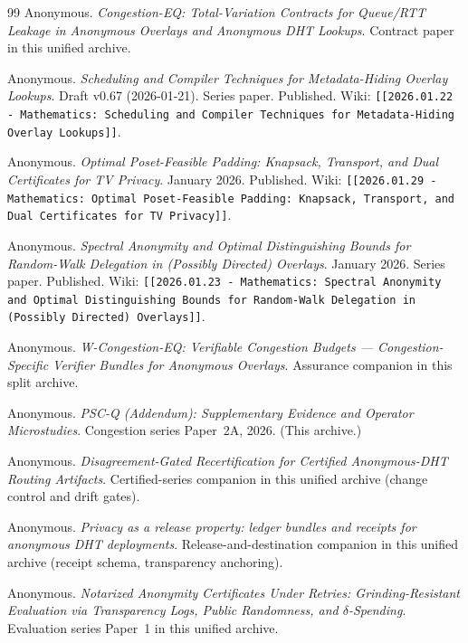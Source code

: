 \documentclass[11pt]{article}
\theoremstyle{definition}
\theoremstyle{remark}
\begin{document}
\begin{thebibliography}{99}
Anonymous.
\newblock \emph{Congestion-EQ: Total-Variation Contracts for Queue/RTT Leakage in Anonymous Overlays and Anonymous DHT Lookups}.
\newblock Contract paper in this unified archive.

Anonymous.
\newblock \emph{Scheduling and Compiler Techniques for Metadata-Hiding Overlay Lookups}.
\newblock Draft v0.67 (2026-01-21). Series paper.
\newblock Published. Wiki: \texttt{[[2026.01.22 - Mathematics: Scheduling and Compiler Techniques for Metadata-Hiding Overlay Lookups]]}.

Anonymous.
\newblock \emph{Optimal Poset-Feasible Padding: Knapsack, Transport, and Dual Certificates for TV Privacy}.
\newblock January 2026. Published. Wiki: \texttt{[[2026.01.29 - Mathematics: Optimal Poset-Feasible Padding: Knapsack, Transport, and Dual Certificates for TV Privacy]]}.

Anonymous.
\newblock \emph{Spectral Anonymity and Optimal Distinguishing Bounds for Random-Walk Delegation in (Possibly Directed) Overlays}.
\newblock January 2026. Series paper.
\newblock Published. Wiki: \texttt{[[2026.01.23 - Mathematics: Spectral Anonymity and Optimal Distinguishing Bounds for Random-Walk Delegation in (Possibly Directed) Overlays]]}.

Anonymous.
\newblock \emph{W-Congestion-EQ: Verifiable Congestion Budgets --- Congestion-Specific Verifier Bundles for Anonymous Overlays}.
\newblock Assurance companion in this split archive.

Anonymous.
\newblock \emph{PSC-Q (Addendum): Supplementary Evidence and Operator Microstudies}.
\newblock Congestion series Paper~2A, 2026. (This archive.)

Anonymous.
\newblock \emph{Disagreement-Gated Recertification for Certified Anonymous-DHT Routing Artifacts}.
\newblock Certified-series companion in this unified archive (change control and drift gates).

Anonymous.
\newblock \emph{Privacy as a release property: ledger bundles and receipts for anonymous DHT deployments}.
\newblock Release-and-destination companion in this unified archive (receipt schema, transparency anchoring).

Anonymous.
\newblock \emph{Notarized Anonymity Certificates Under Retries: Grinding-Resistant Evaluation via Transparency Logs, Public Randomness, and $\delta$-Spending}.
\newblock Evaluation series Paper~1 in this unified archive.


\end{thebibliography}
\end{document}
